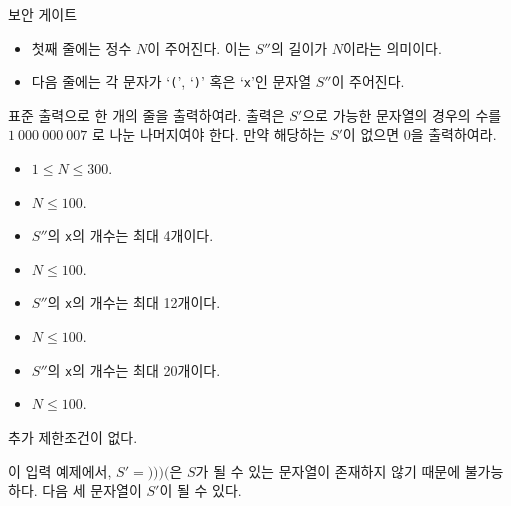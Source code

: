 \begin{problem}{보안 게이트}
	\begin{itemize}
		\item 첫째 줄에는 정수 $N$이 주어진다. 이는 $S''$의 길이가 $N$이라는 의미이다.
		\item 다음 줄에는 각 문자가 `\texttt{(}', `\texttt{)}' 혹은 `\texttt{x}'인 문자열 $S''$이 주어진다.
	\end{itemize}
	
	\OutputFile
	
	표준 출력으로 한 개의 줄을 출력하여라. 출력은 $S'$으로 가능한 문자열의 경우의 수를 $1\ 000\ 000\ 007$ 로 나눈 나머지여야 한다. 만약 해당하는 $S'$이 없으면 0을 출력하여라.
	
	\Constraints
	
	\begin{itemize}
		\item $1 \le N \le 300$.
	\end{itemize}
	
	
	\begin{itemize}
		\item $N \le 100$.
		\item $S''$의 \texttt{x}의 개수는 최대 4개이다.
	\end{itemize}

	\begin{itemize}
		\item $N \le 100$.
		\item $S''$의 \texttt{x}의 개수는 최대 12개이다.
	\end{itemize}

\begin{itemize}
	\item $N \le 100$.
	\item $S''$의 \texttt{x}의 개수는 최대 20개이다.
\end{itemize}

\begin{itemize}
	\item $N \le 100$.
\end{itemize}


	
	추가 제한조건이 없다.
	
	\Examples
	
	\begin{example}
	\end{example}
	
	이 입력 예제에서, $S' = \texttt{)))(}$은 $S$가 될 수 있는 문자열이 존재하지 않기 때문에 불가능하다.
	다음 세 문자열이 $S'$이 될 수 있다.
	

\end{problem}
